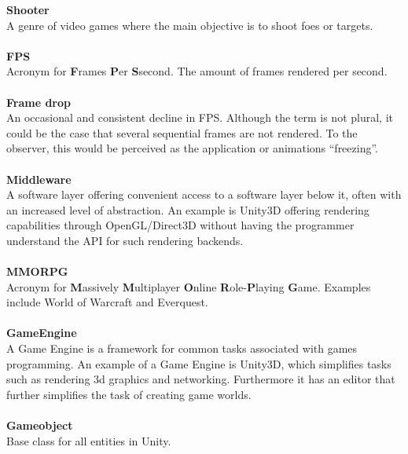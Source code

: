 \textbf{Shooter}\vspace{4pt}\\
A genre of video games where the main objective is to shoot foes or targets. \cite{oxShooter}\\
\\
\textbf{FPS}\vspace{4pt}\\
Acronym for \textbf{F}rames \textbf{P}er \textbf{S}second.
The amount of frames rendered per second.\\
\\
\textbf{Frame drop}\vspace{4pt}\\
An occasional and consistent decline in FPS. Although the term is not plural, it could be the case that several sequential frames are not rendered.
To the observer, this would be perceived as the application or animations ``freezing''.\\
\\
\textbf{Middleware}\vspace{4pt}\\
A software layer offering convenient access to a software layer below it, often with an increased level of abstraction.
An example is Unity3D offering rendering capabilities through OpenGL/Direct3D without having the programmer understand the API for such rendering backends.\\
\\
\textbf{MMORPG}\vspace{4pt}\\
Acronym for \textbf{M}assively \textbf{M}ultiplayer \textbf{O}nline \textbf{R}ole-\textbf{P}laying \textbf{G}ame.
Examples include World of Warcraft and Everquest.\\
\\
\textbf{GameEngine}\vspace{4pt}\\
A Game Engine is a framework for common tasks associated with games programming.
An example of a Game Engine is Unity3D, which simplifies tasks such as rendering 3d graphics and networking.
Furthermore it has an editor that further simplifies the task of creating game worlds\cite{unityGameEngine}.\\
\\
\textbf{Gameobject}\vspace{4pt}\\
Base class for all entities in Unity.\cite{prefaceGameobject}\\
\\
